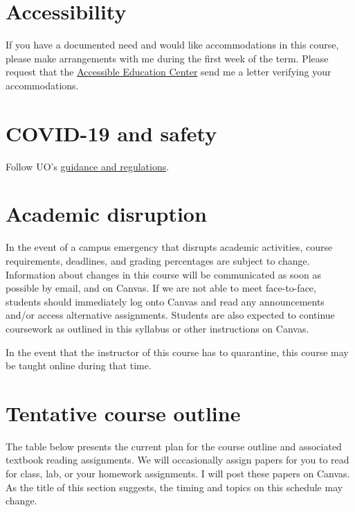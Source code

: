\documentclass[10pt]{article}
\begin{document}
\section*{Accessibility}

If you have a documented need and would like accommodations in this course, please make arrangements with me during the first week of the term. Please request that the \href{https://aec.uoregon.edu/}{Accessible Education Center} send me a letter verifying your accommodations.

\section*{COVID-19 and safety}

Follow UO's \href{https://coronavirus.uoregon.edu}{guidance and regulations}.

\section*{Academic disruption}

In the event of a campus emergency that disrupts academic activities, course requirements, deadlines, and grading percentages are subject to change. Information about changes in this course will be communicated as soon as possible by email, and on Canvas. If we are not able to meet face-to-face, students should immediately log onto Canvas and read any announcements and/or access alternative assignments. Students are also expected to continue coursework as outlined in this syllabus or other instructions on Canvas.

In the event that the instructor of this course has to quarantine, this course may be taught online during that time.

\section*{Tentative course outline}

The table below presents the current plan for the course outline and associated textbook reading assignments. We will occasionally assign papers for you to read for class, lab, or your homework assignments. I will post these papers on Canvas. As the title of this section suggests, the timing and topics on this schedule may change.
\end{document}

